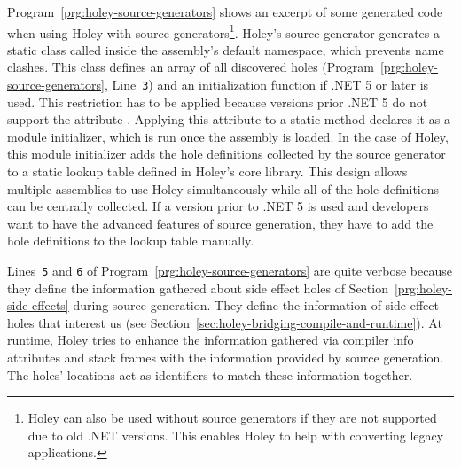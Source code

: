 Program~\ref{prg:holey-source-generators} shows an excerpt of some generated code when using Holey with source generators\footnote{Holey can also be used without source generators if they are not supported due to old .NET versions. This enables Holey to help with converting legacy applications.}.
Holey's source generator generates a static class called \texttt{} inside the assembly's default namespace, which prevents name clashes.
This class defines an array of all discovered holes (Program~\ref{prg:holey-source-generators}, Line~\verb|3|) and an initialization function if .NET 5 or later is used.
This restriction has to be applied because versions prior .NET 5 do not support the \texttt{\seqsplit{[ModuleInitializer]}} attribute \cite{microsoft_module_2023}.
Applying this attribute to a static method declares it as a module initializer, which is run once the assembly is loaded.
In the case of Holey, this module initializer adds the hole definitions collected by the source generator to a static lookup table defined in Holey's core library.
This design allows multiple assemblies to use Holey simultaneously while all of the hole definitions can be centrally collected.
If a version prior to .NET 5 is used and developers want to have the advanced features of source generation, they have to add the hole definitions to the lookup table manually.

Lines~\verb|5| and \verb|6| of Program~\ref{prg:holey-source-generators} are quite verbose because they define the information gathered about side effect holes of Section~\ref{prg:holey-side-effects} during source generation.
They define the information of side effect holes that interest us (see Section~\ref{sec:holey-bridging-compile-and-runtime}).
At runtime, Holey tries to enhance the information gathered via compiler info attributes and stack frames with the information provided by source generation.
The holes' locations act as identifiers to match these information together.

